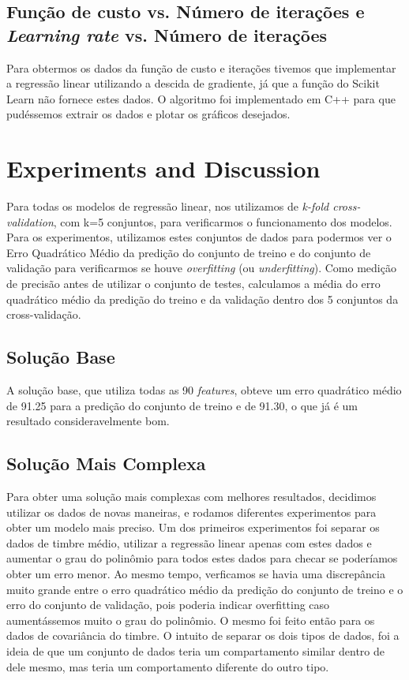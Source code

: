 \documentclass[conference]{IEEEtran}
\begin{document}
\subsection{Função de custo vs. Número de iterações e \textit{Learning rate} vs. Número de iterações}
Para obtermos os dados da função de custo e iterações tivemos que implementar a regressão linear utilizando a descida de gradiente, já que a função do Scikit Learn não fornece estes dados. O algoritmo foi implementado em C++ para que pudéssemos extrair os dados e plotar os gráficos desejados.

\section{Experiments and Discussion}
Para todas os modelos de regressão linear, nos utilizamos de \textit{k-fold cross-validation}, com k=5 conjuntos, para verificarmos o funcionamento dos modelos. Para os experimentos, utilizamos estes conjuntos de dados para podermos ver o Erro Quadrático Médio da predição do conjunto de treino e do conjunto de validação para verificarmos se houve \textit{overfitting} (ou \textit{underfitting}). Como medição de precisão antes de utilizar o conjunto de testes, calculamos a média do erro quadrático médio da predição do treino e da validação dentro dos 5 conjuntos da cross-validação.

\subsection{Solução Base}
A solução base, que utiliza todas as 90 \textit{features}, obteve um erro quadrático médio de 91.25 para a predição do conjunto de treino e de 91.30, o que já é um resultado consideravelmente bom.

\subsection{Solução Mais Complexa}
Para obter uma solução mais complexas com melhores resultados, decidimos utilizar os dados de novas maneiras, e rodamos diferentes experimentos para obter um modelo mais preciso. Um dos primeiros experimentos foi separar os dados de timbre médio, utilizar a regressão linear apenas com estes dados e aumentar o grau do polinômio para todos estes dados para checar se poderíamos obter um erro menor. Ao mesmo tempo, verficamos se havia uma discrepância muito grande entre o erro quadrático médio da predição do conjunto de treino e o erro do conjunto de validação, pois poderia indicar overfitting caso aumentássemos muito o grau do polinômio. O mesmo foi feito então para os dados de covariância do timbre. O intuito de separar os dois tipos de dados, foi a ideia de que um conjunto de dados teria um compartamento similar dentro de dele mesmo, mas teria um comportamento diferente do outro tipo.
\end{document}
